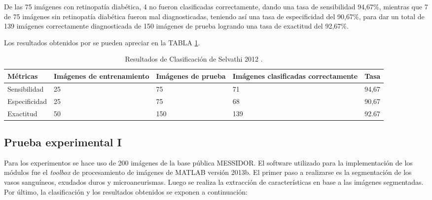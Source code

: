 De las 75 imágenes con retinopatía diabética, 4 no fueron clasificadas correctamente, dando una tasa de sensibilidad 94,67\%, mientras que 7 de 75 imágenes sin retinopatía diabética fueron mal diagnosticadas, teniendo así una tasa de especificidad del 90,67\%, para dar  un total de 139 imágenes correctamente diagnosticada de 150 imágenes de prueba logrando una tasa de exactitud del 92,67\%.

Los resultados  obtenidos por \cite{selvathi2012automated} se pueden apreciar en la TABLA \ref{tab:resultados1}. 

\begin{table}[!hbtp]
\begin{center}
\caption{Resultados de Clasificación de Selvathi 2012 \cite{selvathi2012automated}.}
\resizebox{15cm}{!} {
\begin{tabular}{|p{2.2cm}|p{1.9cm}|p{2.2cm}|p{2.4cm}|p{2cm}|}


\hline
Métricas &  Imágenes de entrenamiento & Imágenes de prueba  & Imágenes clasificadas correctamente  & Tasa \\ 
\hline
Sensibilidad & 25 & 75 & 71 & 94,67 \\
Especificidad & 25 & 75 & 68 & 90,67  \\
Exactitud  & 50 & 150  & 139  & 92.67 \\
\hline
\end{tabular}
}

\label{tab:resultados1}
\end{center}
\end{table}
 
\subsection{Prueba experimental I}
Para los experimentos se hace uso de 200 imágenes de la base pública MESSIDOR. El software utilizado para la implementación de los módulos fue el \textit{toolbox} de procesamiento de imágenes de MATLAB versión 2013b. El primer paso a realizarse es la segmentación de los vasos sanguíneos, exudados duros y microaneurismas. Luego se realiza la extracción de características en base a las imágenes segmentadas. Por último, la clasificación y los resultados obtenidos  se exponen a continuación:


